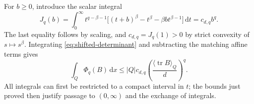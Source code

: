 \documentclass[11pt,a4paper,reqno]{amsart}
\theoremstyle{plain}
\theoremstyle{remark}
\numberwithin{equation}{section}
\newcommand{\dd}{\,\mathrm d}
\newcommand{\avg}[1]{\langle#1\rangle_Q}
\DeclareMathOperator{\tr}{tr}
\begin{document}
For $b\ge0$, introduce the scalar integral
\begin{equation}\label{eq:J-definition}
 J_q(b)=\int_0^\infty t^{q-\beta-1}
 \bigl[(t+b)^\beta-t^\beta-\beta b t^{\beta-1}\bigr]\dd t
       =c_{d,q}b^q.
\end{equation}
The last equality follows by scaling, and $c_{d,q}=J_q(1)>0$ by strict convexity of $s\mapsto s^\beta$. Integrating \eqref{eq:shifted-determinant} and subtracting the matching affine terms gives
\begin{equation}\label{eq:Phi-average}
 \int_Q\Phi_q(B)\dd x
 \le |Q|c_{d,q}\left(\frac{\avg{\tr B}}d\right)^q.
\end{equation}
All integrals can first be restricted to a compact interval in $t$; the bounds just proved then justify passage to $(0,\infty)$ and the exchange of integrals.
\end{document}
